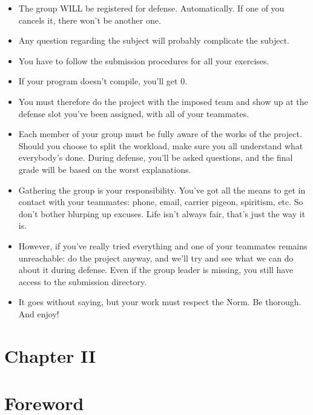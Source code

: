 \documentclass[12pt]{article}
\begin{document}
\begin{itemize}
  \item The group WILL be registered for defense. Automatically. If one of you cancels it, there won't be another one.
  \item Any question regarding the subject will probably complicate the subject.
  \item You have to follow the submission procedures for all your exercises.
  \item If your program doesn't compile, you'll get 0.
  \item You must therefore do the project with the imposed team and show up at the defense slot you've been assigned, with all of your teammates.
  \item Each member of your group must be fully aware of the works of the project. Should you choose to split the workload, make sure you all understand what everybody's done. During defense, you'll be asked questions, and the final grade will be based on the worst explanations.
  \item Gathering the group is your responsibility. You've got all the means to get in contact with your teammates: phone, email, carrier pigeon, spiritism, etc. So don't bother blurping up excuses. Life isn't always fair, that's just the way it is.
  \item However, if you've really tried everything and one of your teammates remains unreachable: do the project anyway, and we'll try and see what we can do about it during defense. Even if the group leader is missing, you still have access to the submission directory.
  \item It goes without saying, but your work must respect the Norm. Be thorough. And enjoy!
\end{itemize}

\newpage

\section*{\LARGE Chapter II}
\section*{\LARGE Foreword}
\end{document}
